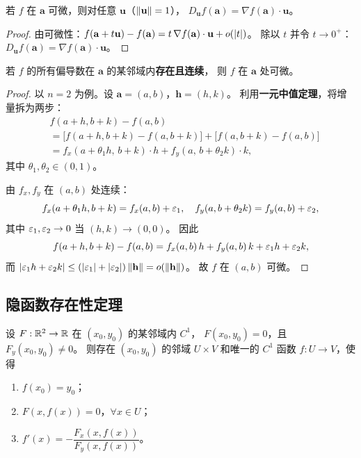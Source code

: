 \documentclass{ctexart}
\begin{document}
\begin{theorem}
  \label{thm:diff-dir}
  若 $f$ 在 $\mathbf{a}$ 可微，则对任意 $\mathbf{u}$（$\left\| \mathbf{u} \right\|=1$），
  $D_{\mathbf{u}}f(\mathbf{a}) = \nabla f(\mathbf{a}) \cdot \mathbf{u}$。
\end{theorem}

\begin{proof}
  由可微性：$f(\mathbf{a}+t\mathbf{u}) - f(\mathbf{a}) = t\,\nabla f(\mathbf{a})\cdot\mathbf{u} + o(\left| t \right|)$。
  除以 $t$ 并令 $t \to 0^+$：
  $D_{\mathbf{u}}f(\mathbf{a}) = \nabla f(\mathbf{a}) \cdot \mathbf{u}$。
\end{proof}

\begin{theorem}
  \label{thm:C1-diff}
  若 $f$ 的所有偏导数在 $\mathbf{a}$ 的某邻域内\textbf{存在且连续}，
  则 $f$ 在 $\mathbf{a}$ 处可微。
\end{theorem}

\begin{proof}
  以 $n=2$ 为例。设 $\mathbf{a} = (a,b)$，$\mathbf{h} = (h,k)$。
  利用\textbf{一元中值定理}，将增量拆为两步：
  \begin{align*}
    &f(a+h,b+k) - f(a,b) \\
    &= \bigl[f(a+h,b+k) - f(a,b+k)\bigr] + \bigl[f(a,b+k) - f(a,b)\bigr] \\
    &= f_x(a+\theta_1 h,\, b+k) \cdot h + f_y(a,\, b+\theta_2 k) \cdot k,
  \end{align*}
  其中 $\theta_1, \theta_2 \in (0,1)$。

  由 $f_x, f_y$ 在 $(a,b)$ 处连续：
  \[
    f_x(a+\theta_1 h, b+k) = f_x(a,b) + \varepsilon_1, \quad
    f_y(a, b+\theta_2 k) = f_y(a,b) + \varepsilon_2,
  \]
  其中 $\varepsilon_1, \varepsilon_2 \to 0$ 当 $(h,k) \to (0,0)$。
  因此
  \[
    f(a+h,b+k) - f(a,b)
    = f_x(a,b)\,h + f_y(a,b)\,k + \varepsilon_1 h + \varepsilon_2 k,
  \]
  而 $\left| \varepsilon_1 h + \varepsilon_2 k \right| \le (\left| \varepsilon_1 \right|+\left| \varepsilon_2 \right|)\left\| \mathbf{h} \right\| = o(\left\| \mathbf{h} \right\|)$。
  故 $f$ 在 $(a,b)$ 可微。
\end{proof}

\subsection{隐函数存在性定理}

\begin{theorem}
  \label{thm:implicit-1d}
  设 $F: \mathbb{R}^2 \to \mathbb{R}$ 在 $(x_0, y_0)$ 的某邻域内 $C^1$，
  $F(x_0, y_0) = 0$，且 $F_y(x_0, y_0) \ne 0$。
  则存在 $(x_0, y_0)$ 的邻域 $U \times V$ 和唯一的 $C^1$ 函数 $f: U \to V$，使得
  \begin{enumerate}
    \item $f(x_0) = y_0$；
    \item $F(x, f(x)) = 0$，$\forall x \in U$；
    \item $f'(x) = -\dfrac{F_x(x, f(x))}{F_y(x, f(x))}$。
  \end{enumerate}
\end{theorem}
\end{document}
